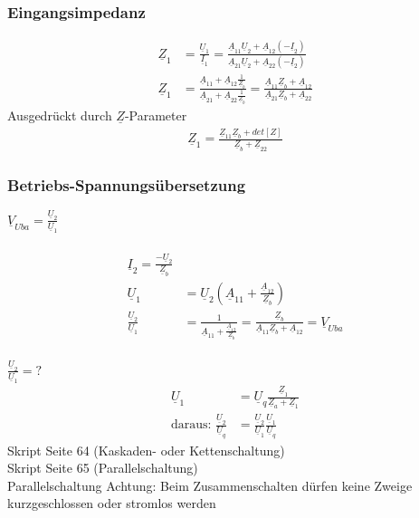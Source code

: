 \subsubsection{Eingangsimpedanz}
\begin{align}
	\underline{Z}_1&=\frac{\underline{U}_1}{\underline{I}_1}=\frac{\underline{A}_{11}\underline{U}_{2}+\underline{A}_{12}\left(-\underline{I}_2\right)}{\underline{A}_{21}\underline{U}_2+\underline{A}_{22}\left(-\underline{I}_2\right)}\nonumber\\
	\underline{Z}_1&=\frac{\underline{A}_{11}+\underline{A}_{12}\frac{1}{\underline{Z}_b}}{\underline{A}_{21}+\underline{A}_{22}\frac{1}{\underline{Z}_b}}=\frac{\underline{A}_{11}\underline{Z}_b+\underline{A}_{12}}{\underline{A}_{21}\underline{Z}_b+\underline{A}_{22}}\nonumber
\end{align}
Ausgedrückt durch $\underline{Z}$-Parameter
\begin{align}
	\underline{Z}_1=\frac{\underline{Z}_{11}\underline{Z}_b+det[Z]}{\underline{Z}_b+\underline{Z}_{22}}\nonumber
\end{align}
\subsubsection{Betriebs-Spannungsübersetzung}
$\underline{V}_{Uba}=\frac{\underline{U}_{2}}{\underline{U}_{1}}$\\
\\
\begin{align}
	\underline{I}_{2}=\frac{-\underline{U}_{2}}{\underline{Z}_{b}}\nonumber\\
	\underline{U}_{1}&=\underline{U}_{2}\left(\underline{A}_{11}+\frac{\underline{A}_{12}}{\underline{Z}_{b}}\right)\nonumber\\
	\frac{\underline{U}_{2}}{\underline{U}_{1}}&=\frac{1}{\underline{A}_{11}+\frac{\underline{A}_{12}}{\underline{Z}_{b}}}=\frac{\underline{Z}_{b}}{\underline{A}_{11}\underline{Z}_{b}+\underline{A}_{12}}=\underline{V}_{Uba}\nonumber
\end{align}
\\

$\frac{\underline{U}_{2}}{\underline{U}_{1}}=?$\\
\begin{align}
	\underline{U}_{1}&=\underline{U}_{q}\frac{\underline{Z}_{1}}{\underline{Z}_{a}+\underline{Z}_{1}}\nonumber\\
	\text{daraus: }
	\frac{\underline{U}_{2}}{\underline{U}_{q}}&=\frac{\underline{U}_{2}}{\underline{U}_{1}}\frac{\underline{U}_{1}}{\underline{U}_{q}}\nonumber
\end{align}
Skript Seite 64 (Kaskaden- oder Kettenschaltung)\\
Skript Seite 65 (Parallelschaltung)\\
Parallelschaltung Achtung: Beim Zusammenschalten dürfen keine Zweige
kurzgeschlossen oder stromlos werden\\
